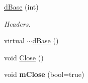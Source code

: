 \begin{DoxyCompactItemize}
\item 
\hyperlink{classdBase_aa6b988b284296519d767b538c201f3d7}{dBase} (int)
\begin{DoxyCompactList}\small\item\em Headers. \item\end{DoxyCompactList}\item 
virtual \hyperlink{classdBase_a91351d88d15c348fdfb3ef93be1c20d7}{$\sim$dBase} ()
\item 
void \hyperlink{classdBase_a0c8962454c0efe44b216c28bbd04eb9a}{Close} ()
\item 
\hypertarget{classdBase_ae26cd777403e29e70cd76d650c4a58de}{
void {\bfseries mClose} (bool=true)}
\label{classdBase_ae26cd777403e29e70cd76d650c4a58de}


\end{DoxyCompactItemize}
